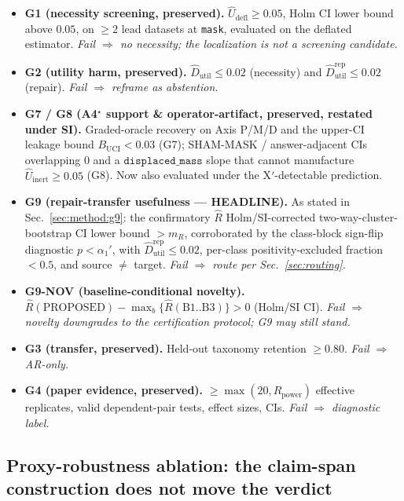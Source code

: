 \documentclass[11pt]{article}
\theoremstyle{plain}
\theoremstyle{definition}
\newcommand{\Uhat}{\widehat{U}}
\newcommand{\Rhat}{\widehat{R}}
\newcommand{\Udefl}{\widehat{U}_{\mathrm{defl}}}
\newcommand{\Dutil}{\widehat{D}_{\mathrm{util}}}
\newcommand{\Dutilr}{\widehat{D}^{\mathrm{rep}}_{\mathrm{util}}}
\begin{document}
\begin{itemize}[leftmargin=1.4em,itemsep=2pt]
  \item \textbf{G1 (necessity screening, preserved).} $\Udefl\ge0.05$, Holm CI lower
  bound above $0.05$, on $\ge2$ lead datasets at \texttt{mask}, evaluated on the
  deflated estimator. \emph{Fail $\Rightarrow$ no necessity; the localization is not
  a screening candidate.}
  \item \textbf{G2 (utility harm, preserved).} $\Dutil\le0.02$ (necessity) and
  $\Dutilr\le0.02$ (repair). \emph{Fail $\Rightarrow$ reframe as abstention.}
  \item \textbf{G7 / G8 (A4$^\star$ support \& operator-artifact, preserved, restated
  under SI).} Graded-oracle recovery on Axis P/M/D and the upper-CI leakage bound
  $B_{\mathrm{UCI}}<0.03$ (G7); SHAM-MASK / answer-adjacent CIs overlapping $0$ and a
  $\texttt{displaced\_mass}$ slope that cannot manufacture $\Uhat_{\mathrm{inert}}\ge0.05$
  (G8). Now also evaluated under the X$'$-detectable prediction.
  \item \textbf{G9 (repair-transfer usefulness --- HEADLINE).} As stated in
  Sec.~\ref{sec:method:g9}: the confirmatory $\Rhat$ Holm/SI-corrected
  two-way-cluster-bootstrap CI lower bound $>m_R$, corroborated by the class-block
  sign-flip diagnostic $p<\alpha_1'$, with $\Dutilr\le0.02$,
  per-class positivity-excluded fraction $<0.5$, and source $\ne$ target. \emph{Fail
  $\Rightarrow$ route per Sec.~\ref{sec:routing}.}
  \item \textbf{G9-NOV (baseline-conditional novelty).} $\Rhat(\text{PROPOSED})-\max_b\{\Rhat(\text{B1..B3})\}>0$
  (Holm/SI CI). \emph{Fail $\Rightarrow$ novelty downgrades to the certification
  protocol; G9 may still stand.}
  \item \textbf{G3 (transfer, preserved).} Held-out taxonomy retention $\ge0.80$.
  \emph{Fail $\Rightarrow$ AR-only.}
  \item \textbf{G4 (paper evidence, preserved).} $\ge\max(20,R_{\mathrm{power}})$
  effective replicates, valid dependent-pair tests, effect sizes, CIs. \emph{Fail
  $\Rightarrow$ diagnostic label.}
\end{itemize}

\subsection{Proxy-robustness ablation: the claim-span construction does not move the verdict}\label{sec:setup:proxyablation}
\end{document}
